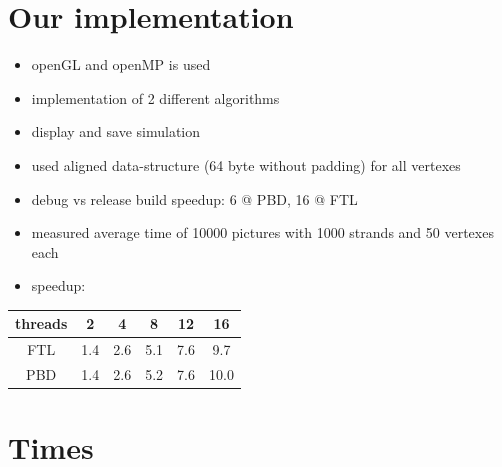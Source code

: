 \documentclass[
paper=192mm:144mm, %
fontsize=12pt, %
pagesize, %
parskip=half-, %
]{scrartcl} %
\theoremstyle{mythmstyle} %
\begin{document}
\clearpage


\section{\color{white}Our implementation}

\begin{itemize}
\setlength\itemsep{-5mm}
\item openGL and openMP is used
\item implementation of 2 different algorithms
\item display and save simulation
\item used aligned data-structure (64 byte without padding) for all vertexes
\item debug vs release build speedup: 6 @ PBD, 16 @ FTL
\item measured average time of 10000 pictures with 1000 strands and 50 vertexes each
\item speedup:
\end{itemize}

\begin{center}
\begin{tabular}{|c|c|c|c|c|c|}
\hline
threads & 2 & 4 & 8 & 12 & 16 \\
\hline
FTL & 1.4 & 2.6 & 5.1 & 7.6 & 9.7\\
\hline
PBD & 1.4 & 2.6 & 5.2 & 7.6 & 10.0\\
\hline
\end{tabular}
\end{center}

\clearpage


\section{\color{white}Times}
\end{document}
